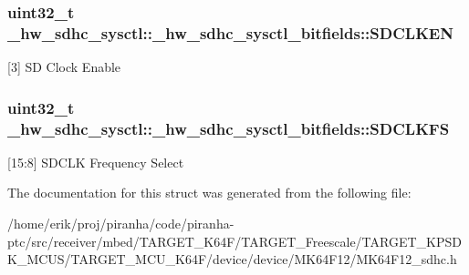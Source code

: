 \subsubsection[{\texorpdfstring{S\+D\+C\+L\+K\+EN}{SDCLKEN}}]{\setlength{\rightskip}{0pt plus 5cm}uint32\+\_\+t \+\_\+hw\+\_\+sdhc\+\_\+sysctl\+::\+\_\+hw\+\_\+sdhc\+\_\+sysctl\+\_\+bitfields\+::\+S\+D\+C\+L\+K\+EN}\hypertarget{struct__hw__sdhc__sysctl_1_1__hw__sdhc__sysctl__bitfields_ac02abd7ee6d35d40c47e1d3676c2c969}{}\label{struct__hw__sdhc__sysctl_1_1__hw__sdhc__sysctl__bitfields_ac02abd7ee6d35d40c47e1d3676c2c969}
\mbox{[}3\mbox{]} SD Clock Enable 
\subsubsection[{\texorpdfstring{S\+D\+C\+L\+K\+FS}{SDCLKFS}}]{\setlength{\rightskip}{0pt plus 5cm}uint32\+\_\+t \+\_\+hw\+\_\+sdhc\+\_\+sysctl\+::\+\_\+hw\+\_\+sdhc\+\_\+sysctl\+\_\+bitfields\+::\+S\+D\+C\+L\+K\+FS}\hypertarget{struct__hw__sdhc__sysctl_1_1__hw__sdhc__sysctl__bitfields_a03c62dee21be12a9aec6807b4bd8a0c5}{}\label{struct__hw__sdhc__sysctl_1_1__hw__sdhc__sysctl__bitfields_a03c62dee21be12a9aec6807b4bd8a0c5}
\mbox{[}15\+:8\mbox{]} S\+D\+C\+LK Frequency Select 

The documentation for this struct was generated from the following file\+:\begin{DoxyCompactItemize}
\item 
/home/erik/proj/piranha/code/piranha-\/ptc/src/receiver/mbed/\+T\+A\+R\+G\+E\+T\+\_\+\+K64\+F/\+T\+A\+R\+G\+E\+T\+\_\+\+Freescale/\+T\+A\+R\+G\+E\+T\+\_\+\+K\+P\+S\+D\+K\+\_\+\+M\+C\+U\+S/\+T\+A\+R\+G\+E\+T\+\_\+\+M\+C\+U\+\_\+\+K64\+F/device/device/\+M\+K64\+F12/M\+K64\+F12\+\_\+sdhc.\+h\end{DoxyCompactItemize}
